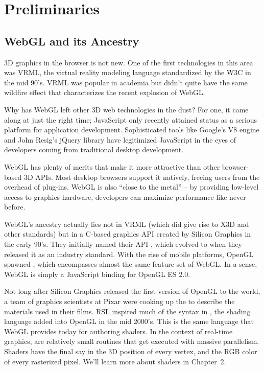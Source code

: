 \chapter{Preliminaries}%
\label{ch1}

\section{WebGL and its Ancestry}

3D graphics in the browser is not new.  One of the first technologies in this area was  VRML, the virtual reality modeling language standardized by the W3C in the mid 90's.  VRML was popular in academia but didn't quite have the same wildfire effect that characterizes the recent explosion of WebGL.

Why has WebGL left other 3D web technologies in the dust?  For one, it came along at just the right time; JavaScript only recently attained status as a serious platform for application development.  Sophisticated tools like Google's V8  engine  and John Resig's jQuery  library have legitimized JavaScript in the eyes of developers coming from traditional desktop development.

WebGL has plenty of merits that make it more attractive than other browser-based 3D APIs.  Most desktop browsers support it natively, freeing users from the overhead of plug-ins.  WebGL is also ``close to the metal'' -- by providing low-level access to graphics hardware, developers can maximize performance like never before.

WebGL's ancestry actually lies not in VRML (which did give rise to X3D and other standards) but in a C-based graphics API created by Silicon Graphics in the early 90's.  They initially named their API , which evolved to  when they released it as an industry standard.   With the rise of mobile platforms, OpenGL spawned , which encompasses almost the same feature set of WebGL.  In a sense, WebGL is simply a JavaScript binding for OpenGL ES 2.0.

Not long after Silicon Graphics released the first version of OpenGL to the world, a team of graphics scientists at Pixar were cooking up the  to describe the materials used in their films.  RSL inspired much of the syntax in , the shading language added into OpenGL in the mid 2000's.  This is the same language that WebGL provides today for authoring shaders.  In the context of real-time graphics,  are relatively small routines that get executed with massive parallelism.  Shaders have the final say in the 3D position of every vertex, and the RGB color of every rasterized pixel.  We'll learn more about shaders in Chapter~2.

